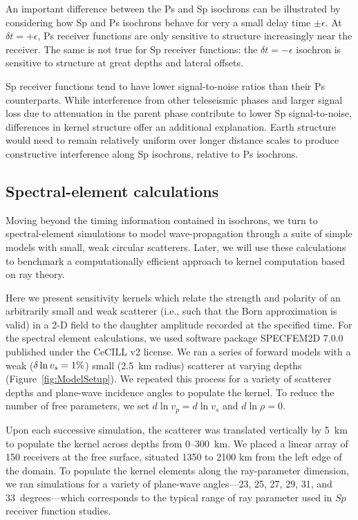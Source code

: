 \documentclass[referee]{gji}
\begin{document}
An important difference between the Ps and Sp isochrons can be illustrated by considering how Sp and Ps isochrons behave for very a small delay time $\pm \epsilon$.
At $\delta t=+\epsilon$, Ps receiver functions are only sensitive to structure increasingly near the receiver.  The same is not true for Sp receiver functions: the $\delta t=-\epsilon$ isochron is sensitive to structure at great depths and lateral offsets.

Sp receiver functions tend to have lower signal-to-noise ratios than their Ps counterparts.  While interference from other teleseismic phases and larger signal loss due to attenuation in the parent phase contribute to lower Sp signal-to-noise, differences in kernel structure offer an additional explanation.  Earth structure would need to remain relatively uniform over longer distance scales to produce constructive interference along Sp isochrons, relative to Ps isochrons.

\subsection{Spectral-element calculations}

Moving beyond the timing information contained in isochrons, we turn to spectral-element simulations to model wave-propagation through a suite of simple models with small, weak circular scatterers.  Later, we will use these calculations to benchmark a computationally efficient approach to kernel computation based on ray theory. 

Here we present sensitivity kernels which relate the strength and polarity of an arbitrarily small and weak scatterer (i.e., such that the Born approximation is valid) in a 2-D field to the daughter amplitude recorded at the specified time.  For the spectral element calculations, we used software package SPECFEM2D 7.0.0 \citep{Tromp2008, specfem2dsoftware} published under the CeCILL v2 license.  We ran a series of forward models with a weak ($\delta \ln v_s = 1\%$) small (2.5~km radius) scatterer at varying depths (Figure~\ref{fig:ModelSetup}).  We repeated this process for a variety of scatterer depths and plane-wave incidence angles to populate the kernel.  To reduce the number of free parameters, we set $d\ln v_p=d\ln v_s$ and $d\ln \rho =0$.

Upon each successive simulation, the scatterer was translated vertically by 5~km to populate the kernel across depths from 0--300~km. We placed a linear array of 150 receivers at the free surface, situated 1350 to 2100 km from the left edge of the domain.  To populate the kernel elements along the ray-parameter dimension, we ran simulations for a variety of plane-wave angles---23, 25, 27, 29, 31, and 33~degrees---which corresponds to the typical range of ray parameter used in $Sp$ receiver function studies.
\end{document}
